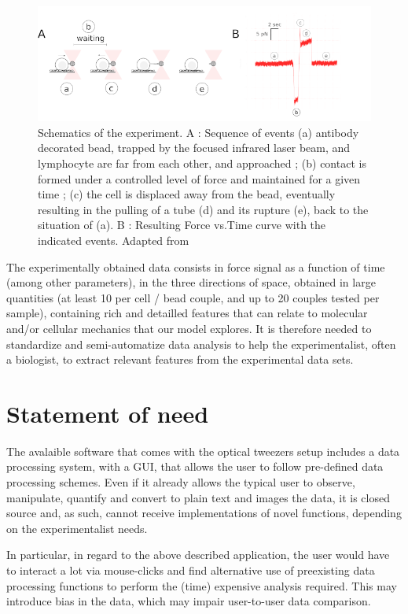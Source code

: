 \documentclass[a4paper]{article}
\begin{document}
\begin{figure}[h]
	\centering
	\includegraphics[width=\linewidth]{dessin2}
	\caption{Schematics of the experiment. A : Sequence of events (a) antibody decorated bead,  trapped by the focused infrared laser beam, and lymphocyte are far from each other, and approached ; (b) contact is formed under a controlled level of force and maintained for a given time ; (c) the cell is displaced away from the bead, eventually resulting in the pulling of a tube (d) and its rupture (e), back to the situation of (a). B : Resulting Force vs.Time curve with the indicated events. Adapted from \cite{manca_membrane_2022}}
	\label{fig:dessin}
\end{figure}

The experimentally obtained data consists in force signal as a function of time
(among other parameters), in the three directions of space, obtained in
large quantities (at least 10 per cell / bead couple, and up to 20
couples tested per sample), containing rich and detailled features that
can relate to molecular and/or cellular mechanics that our model
explores. It is therefore needed to standardize and semi-automatize data
analysis to help the experimentalist, often a biologist, to extract
relevant features from the experimental data sets.


\section{Statement of need}\label{statement-of-need}

The avalaible software that comes with the optical tweezers setup
includes a data processing system, with a GUI, that allows the user to
follow pre-defined data processing schemes. Even if it already allows
the typical user to observe, manipulate, quantify and convert to plain
text and images the data, it is closed source and, as such, cannot
receive implementations of novel functions, depending on the
experimentalist needs.

In particular, in regard to the above described application,
the user would have to interact a lot via mouse-clicks and find
alternative use of preexisting data processing functions to perform the
(time) expensive analysis required. This may introduce bias in the
data, which may impair user-to-user data comparison.
\end{document}
